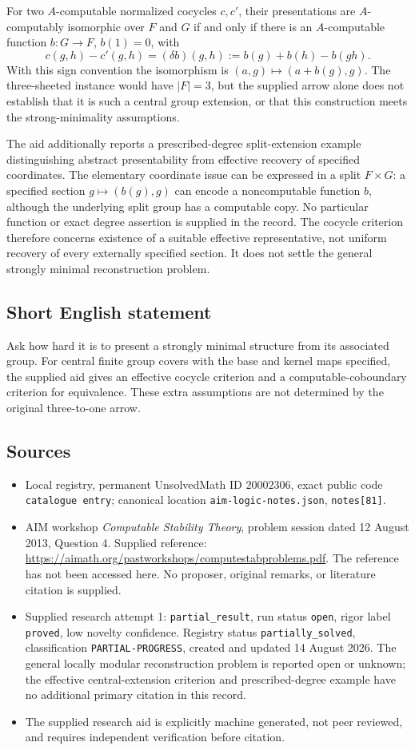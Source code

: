 \documentclass[11pt]{article}
\begin{document}
For two \(A\)-computable normalized cocycles \(c,c'\), their presentations are \(A\)-computably isomorphic over \(F\) and \(G\) if and only if there is an \(A\)-computable function \(b:G\to F\), \(b(1)=0\), with
\[
 c(g,h)-c'(g,h)=(\delta b)(g,h):=b(g)+b(h)-b(gh).
\]
With this sign convention the isomorphism is \((a,g)\mapsto(a+b(g),g)\). The three-sheeted instance would have \(|F|=3\), but the supplied arrow alone does not establish that it is such a central group extension, or that this construction meets the strong-minimality assumptions.

The aid additionally reports a prescribed-degree split-extension example distinguishing abstract presentability from effective recovery of specified coordinates. The elementary coordinate issue can be expressed in a split \(F\times G\): a specified section \(g\mapsto(b(g),g)\) can encode a noncomputable function \(b\), although the underlying split group has a computable copy. No particular function or exact degree assertion is supplied in the record. The cocycle criterion therefore concerns existence of a suitable effective representative, not uniform recovery of every externally specified section. It does not settle the general strongly minimal reconstruction problem.
\subsection{Short English statement}
Ask how hard it is to present a strongly minimal structure from its associated group. For central finite group covers with the base and kernel maps specified, the supplied aid gives an effective cocycle criterion and a computable-coboundary criterion for equivalence. These extra assumptions are not determined by the original three-to-one arrow.
\subsection{Sources}
\begin{itemize}
\item Local registry, permanent UnsolvedMath ID \(20002306\), exact public code \texttt{catalogue entry}; canonical location \texttt{aim-logic-notes.json}, \texttt{notes[81]}.
\item AIM workshop \emph{Computable Stability Theory}, problem session dated 12 August 2013, Question 4. Supplied reference: \url{https://aimath.org/pastworkshops/computestabproblems.pdf}. The reference has not been accessed here. No proposer, original remarks, or literature citation is supplied.
\item Supplied research attempt 1: \texttt{partial\_result}, run status \texttt{open}, rigor label \texttt{proved}, low novelty confidence. Registry status \texttt{partially\_solved}, classification \texttt{PARTIAL-PROGRESS}, created and updated 14 August 2026. The general locally modular reconstruction problem is reported open or unknown; the effective central-extension criterion and prescribed-degree example have no additional primary citation in this record.
\item The supplied research aid is explicitly machine generated, not peer reviewed, and requires independent verification before citation.
\end{itemize}
\end{document}

